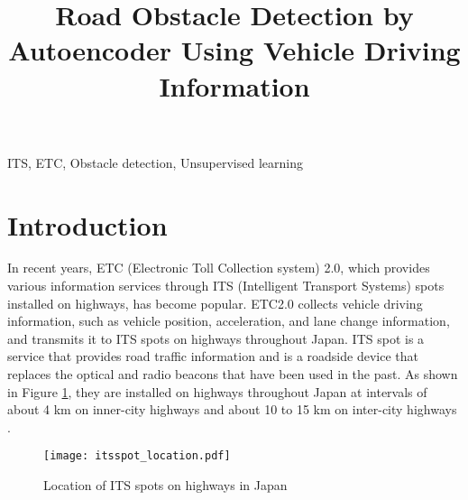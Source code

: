 \documentclass[paper]{ieice}
\title[Road Obstacle Detection by Autoencoder]{Road Obstacle Detection by Autoencoder Using Vehicle Driving Information}
\begin{document}
\maketitle

\begin{summary}

\end{summary}
\begin{keywords}
  ITS, ETC, Obstacle detection, Unsupervised learning
\end{keywords}

\section{Introduction}
\label{sec:introduction}
%
In recent years, ETC (Electronic Toll Collection system) 2.0, which provides various information services through ITS (Intelligent Transport Systems) spots installed on highways, has become popular.
%
ETC2.0 collects vehicle driving information, such as vehicle position, acceleration, and lane change information, and transmits it to ITS spots on highways throughout Japan.
%
ITS spot is a service that provides road traffic information and is a roadside device that replaces the optical and radio beacons that have been used in the past\cite{itsspot}.
%
As shown in Figure \ref{fig:itsspot_location}, they are installed on highways throughout Japan at intervals of about 4 km on inner-city highways and about 10 to 15 km on inter-city highways \cite{etc2.0Location}.
%
\begin{figure}[tb]
  \begin{center}
    \texttt{[image: itsspot\_location.pdf]}
  \end{center}
  \caption{Location of ITS spots on highways in Japan}
  \label{fig:itsspot_location}
\end{figure}
%
\end{document}

